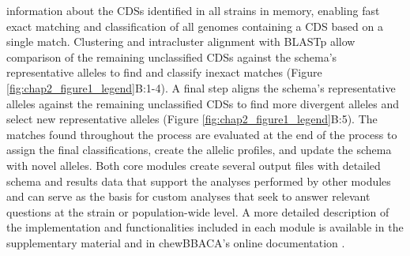 information about the \acp{CDS} identified in all strains in memory, enabling fast exact matching and classification of all genomes containing a \ac{CDS} based on a single match. Clustering and intracluster alignment with \ac{BLASTp} allow comparison of the remaining unclassified \acp{CDS} against the schema's representative alleles to find and classify inexact matches (Figure \ref{fig:chap2_figure1_legend}B:1-4). A final step aligns the schema's representative alleles against the remaining unclassified \acp{CDS} to find more divergent alleles and select new representative alleles (Figure \ref{fig:chap2_figure1_legend}B:5). The matches found throughout the process are evaluated at the end of the process to assign the final classifications, create the allelic profiles, and update the schema with novel alleles. Both core modules create several output files with detailed schema and results data that support the analyses performed by other modules and can serve as the basis for custom analyses that seek to answer relevant questions at the strain or population-wide level.
A more detailed description of the implementation and functionalities included in each module is available in the supplementary material and in chewBBACA’s online documentation \citep{noauthor_chewbbaca_nodate}.

